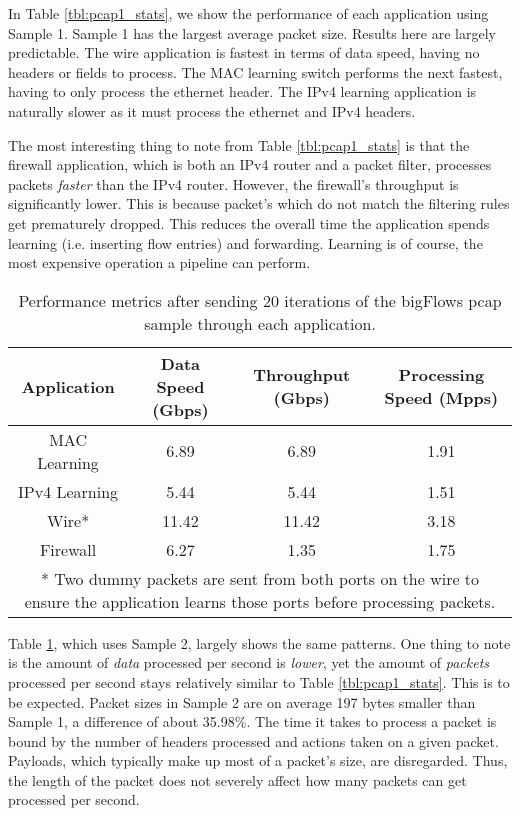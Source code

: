 In Table \ref{tbl:pcap1_stats}, we show the performance of each application using Sample 1. Sample 1 has the largest average packet size. Results here are largely predictable. The wire application is fastest in terms of data speed, having no headers or fields to process. The MAC learning switch performs the next fastest, having to only process the ethernet header. The IPv4 learning application is naturally slower as it must process the ethernet and IPv4 headers.

The most interesting thing to note from Table \ref{tbl:pcap1_stats} is that the firewall application, which is both an IPv4 router and a packet filter, processes packets \textit{faster} than the IPv4 router. However, the firewall's throughput is significantly lower. This is because packet's which do not match the filtering rules get prematurely dropped. This reduces the overall time the application spends learning (i.e. inserting flow entries) and forwarding. Learning is of course, the most expensive operation a pipeline can perform.

\begin{table}
\caption{Performance metrics after sending 20 iterations of the bigFlows pcap sample through each application.}
\begin{center}
\begin{tabularx}{\textwidth}{| c || c | c | c | }
\hline
Application & Data Speed (Gbps) & Throughput (Gbps) & Processing Speed (Mpps)  \\
\hline
MAC Learning & 6.89 & 6.89 & 1.91  \\
\hline
IPv4 Learning & 5.44 & 5.44 & 1.51  \\
\hline 
Wire* & 11.42 & 11.42 & 3.18 \\
\hline
Firewall & 6.27 & 1.35 & 1.75 \\
\hline
\multicolumn{4}{p{\linewidth}}{* Two dummy packets are sent from both ports on the wire to ensure the application learns those ports before processing packets.}
\end{tabularx}
\end{center}
\label{tbl:pcap2_stats}
\end{table}

Table \ref{tbl:pcap2_stats}, which uses Sample 2, largely shows the same patterns. One thing to note is the amount of \textit{data} processed per second is \textit{lower}, yet the amount of \textit{packets} processed per second stays relatively similar to Table \ref{tbl:pcap1_stats}. This is to be expected. Packet sizes in Sample 2 are on average 197 bytes smaller than Sample 1, a difference of about 35.98\%. The time it takes to process a packet is bound by the number of headers processed and actions taken on a given packet. Payloads, which typically make up most of a packet's size, are disregarded. Thus, the length of the packet does not severely affect how many packets can get processed per second. 

